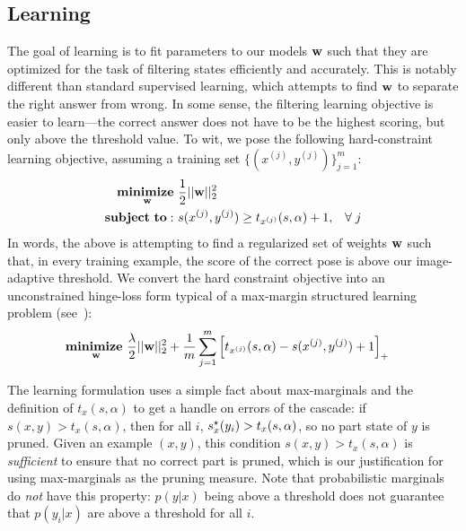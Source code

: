 \subsection{Learning}
The goal of learning is to fit parameters to our models $\mathbf{w}$ such that they are 
optimized for the task of filtering states efficiently and accurately.  This is 
notably different than standard supervised learning, which attempts to find 
$\mathbf{w}$ to separate the right answer from wrong.  In some sense, the filtering 
learning objective is easier to learn---the correct answer does not have to be 
the highest scoring, but only above the threshold value.  To wit, we pose the 
following hard-constraint learning objective, assuming a training set 
$\{(x^{(j)},y^{(j)})\}_{j=1}^m$:
\begin{align}
\mathop{\mathbf{minimize~}}_{\mathbf{w}}& \frac{1}{2} ||\mathbf{w}||_2^2 \\
\mathbf{subject~to:~}& s(x^{(j)},y^{(j)}) \geq t_{x^{(j)}}(s,\alpha) + 1,\;\;\; \forall \; j
\end{align}
In words, the above is attempting to find a regularized set of weights $\mathbf{w}$ 
such that, in every training example, the score of the correct pose is above 
our image-adaptive threshold.  We convert the hard constraint objective into an 
unconstrained hinge-loss form typical of a max-margin structured learning 
problem (see~):
\begin{align}
\mathop{\mathbf{minimize~}}_{\mathbf{w}}& \frac{\lambda}{2} ||\mathbf{w}||_2^2 + \frac{1}{m} \sum_{j=1}^m \left[ 
t_{x^{(j)}}(s,\alpha) - s(x^{(j)},y^{(j)}) + 1 \right]_+
\label{eq:cps-learn-hinge}
\end{align}


The learning formulation uses a simple fact about max-marginals and the 
definition of $t_x(s,\alpha)$
to get a handle on errors of the cascade:
if $s(x,y) > t_x(s,\alpha)$, then for all $i$, $s^\star_x(y_i) >  t_x(s,\alpha)$, so no 
part state of $y$ is pruned.   Given an example $(x,y)$,
this condition $s(x,y) > t_x(s,\alpha)$ is {\em sufficient} to ensure that no 
correct part is pruned, which is our justification for using max-marginals as 
the pruning measure.  Note that probabilistic marginals do {\em not} have this 
property: $p(y|x)$ being above a threshold does not guarantee that $p(y_i|x)$ 
are above a threshold for all $i$.

